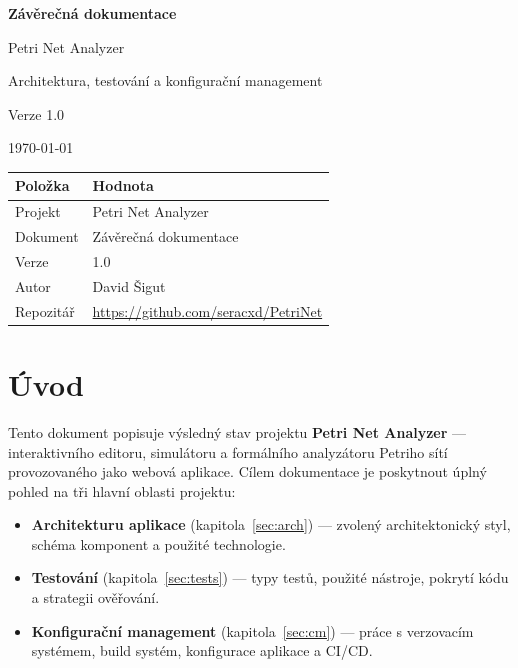 \documentclass[12pt,a4paper]{article}
\begin{document}
\begin{titlepage}
    \centering
    \vspace*{2cm}
    {\Huge\bfseries Závěrečná dokumentace\par}
    \vspace{0.5cm}
    {\LARGE Petri Net Analyzer\par}
    \vspace{0.3cm}
    {\large Architektura, testování a konfigurační management\par}
    \vspace{1.5cm}
    {\large Verze 1.0\par}
    \vspace{0.5cm}
    {\large \today\par}
    \vfill
    \begin{tabular}{ll}
        \toprule
        \textbf{Položka} & \textbf{Hodnota} \\
        \midrule
        Projekt      & Petri Net Analyzer \\
        Dokument     & Závěrečná dokumentace \\
        Verze        & 1.0 \\
        Autor        & David Šigut \\
        Repozitář    & \url{https://github.com/seracxd/PetriNet} \\
        \bottomrule
    \end{tabular}
\end{titlepage}

\tableofcontents
\newpage

\section{Úvod}

Tento dokument popisuje výsledný stav projektu \textbf{Petri Net Analyzer} —
interaktivního editoru, simulátoru a formálního analyzátoru Petriho sítí
provozovaného jako webová aplikace. Cílem dokumentace je poskytnout úplný
pohled na tři hlavní oblasti projektu:

\begin{itemize}
    \item \textbf{Architekturu aplikace} (kapitola~\ref{sec:arch}) — zvolený
          architektonický styl, schéma komponent a použité technologie.
    \item \textbf{Testování} (kapitola~\ref{sec:tests}) — typy testů,
          použité nástroje, pokrytí kódu a strategii ověřování.
    \item \textbf{Konfigurační management} (kapitola~\ref{sec:cm}) — práce
          s verzovacím systémem, build systém, konfigurace aplikace
          a CI/CD.
\end{itemize}
\end{document}
